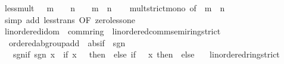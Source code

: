 \begin{isabellebody}
\isamarkupfalse%
%
\endisatagproof
{\isafoldproof}%
%
\isadelimproof
\isanewline
%
\endisadelimproof
\isanewline
{}\isamarkupfalse%
\ less{\isacharunderscore}{\kern0pt}{}{\isacharunderscore}{\kern0pt}mult{\isacharcolon}{\kern0pt}\ {\isachardoublequoteopen}{}\ {\isacharless}{\kern0pt}\ m\ {\isasymLongrightarrow}\ {}\ {\isacharless}{\kern0pt}\ n\ {\isasymLongrightarrow}\ {}\ {\isacharless}{\kern0pt}\ m\ {\isacharasterisk}{\kern0pt}\ n{\isachardoublequoteclose}\isanewline
%
\isadelimproof
\ \ %
\endisadelimproof
%
\isatagproof
{}\isamarkupfalse%
\ mult{\isacharunderscore}{\kern0pt}strict{\isacharunderscore}{\kern0pt}mono\ {\isacharbrackleft}{\kern0pt}of\ {}\ m\ {}\ n{\isacharbrackright}{\kern0pt}\ \isamarkupfalse%
\ {\isacharparenleft}{\kern0pt}simp\ add{\isacharcolon}{\kern0pt}\ less{\isacharunderscore}{\kern0pt}trans\ {\isacharbrackleft}{\kern0pt}OF\ zero{\isacharunderscore}{\kern0pt}less{\isacharunderscore}{\kern0pt}one{\isacharbrackright}{\kern0pt}{\isacharparenright}{\kern0pt}%
\endisatagproof
{\isafoldproof}%
%
\isadelimproof
\isanewline
%
\endisadelimproof
\isanewline
{}\isamarkupfalse%
\isanewline
\isanewline
{}\isamarkupfalse%
\ linordered{\isacharunderscore}{\kern0pt}idom\ {\isacharequal}{\kern0pt}\ comm{\isacharunderscore}{\kern0pt}ring{\isacharunderscore}{\kern0pt}{}\ {\isacharplus}{\kern0pt}\ linordered{\isacharunderscore}{\kern0pt}comm{\isacharunderscore}{\kern0pt}semiring{\isacharunderscore}{\kern0pt}strict\ {\isacharplus}{\kern0pt}\isanewline
\ \ ordered{\isacharunderscore}{\kern0pt}ab{\isacharunderscore}{\kern0pt}group{\isacharunderscore}{\kern0pt}add\ {\isacharplus}{\kern0pt}\ abs{\isacharunderscore}{\kern0pt}if\ {\isacharplus}{\kern0pt}\ sgn\ {\isacharplus}{\kern0pt}\isanewline
\ \ \ sgn{\isacharunderscore}{\kern0pt}if{\isacharcolon}{\kern0pt}\ {\isachardoublequoteopen}sgn\ x\ {\isacharequal}{\kern0pt}\ {\isacharparenleft}{\kern0pt}if\ x\ {\isacharequal}{\kern0pt}\ {}\ then\ {}\ else\ if\ {}\ {\isacharless}{\kern0pt}\ x\ then\ {}\ else\ {\isacharminus}{\kern0pt}\ {}{\isacharparenright}{\kern0pt}{\isachardoublequoteclose}\isanewline
{}\isanewline
\isanewline
{}\isamarkupfalse%
\ linordered{\isacharunderscore}{\kern0pt}ring{\isacharunderscore}{\kern0pt}strict%
\isadelimproof
\ %
\endisadelimproof
%
\isatagproof
\isacommand{{\isachardot}{\kern0pt}{\isachardot}{\kern0pt}}\isamarkupfalse%

\end{isabellebody}
